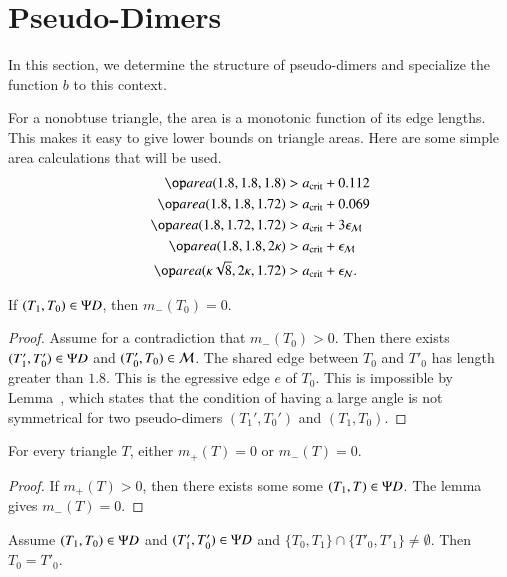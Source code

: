 \section{Pseudo-Dimers}\label{sec:pseudo}

In this section, we determine the structure of pseudo-dimers and
specialize the function $b$ to this context.

For a nonobtuse triangle, the area is a monotonic function of its edge
lengths.  This makes it easy to give lower bounds on triangle areas.
Here are some simple area calculations that will be used.
\begin{align*}
\area(1.8,1.8,1.8) &> \acrit + 0.112\\
\area(1.8,1.8,1.72) &> \acrit + 0.069\\
\area(1.8,1.72,1.72) &> \acrit + 3\epsM\\
\area(1.8,1.8,2\kappa) &> \acrit + \epsM\\
\area(\kappa\sqrt8,2\kappa,1.72) &> \acrit +\epsN.
\end{align*}

\begin{lemma}  
If $(T_1,T_0)\in\Psi D$, then $m_-(T_0)=0$.
\end{lemma}

\begin{proof} 
  Assume for a contradiction that $m_-(T_0)>0$.  Then there exists
  $(T'_1,T_0')\in\Psi D$ and $(T'_0,T_0)\in\mathcal M$.  The shared edge between
  $T_0$ and $T'_0$ has length greater than $1.8$.  This is the
  egressive edge $e$ of $T_0$.  This is impossible by
  Lemma~, which states that the condition of having a
  large angle is not symmetrical for two pseudo-dimers $(T_1',T_0')$
  and $(T_1,T_0)$.
\end{proof}

\begin{corollary}  
  For every triangle $T$, either $m_+(T)=0$ or $m_-(T)=0$.
\end{corollary}

\begin{proof}  
  If $m_+(T)>0$, then there exists some some $(T_1,T)\in\Psi D$.  The
  lemma gives $m_-(T)=0$.
\end{proof}

\begin{lemma}  
  Assume $(T_1,T_0)\in \Psi D$ and $(T'_1,T'_0)\in\Psi D$ and
  $\{T_0,T_1\}\cap\{T'_0,T'_1\} \ne \emptyset$.  Then $T_0 = T'_0$.
\end{lemma}

